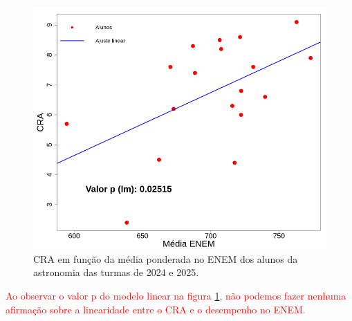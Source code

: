 \begin{figure}
    \centering
    \includegraphics[width=0.8\linewidth]{Figuras/corr_enem.png}
    \caption{CRA em função da média ponderada no ENEM dos alunos da astronomia das turmas de 2024 e 2025.}
    \label{corr_enem}
\end{figure}


\textcolor{red}{Ao observar o valor p do modelo linear na figura \ref{corr_enem}, não podemos fazer nenhuma afirmação sobre a linearidade entre o CRA e o desempenho no ENEM.}